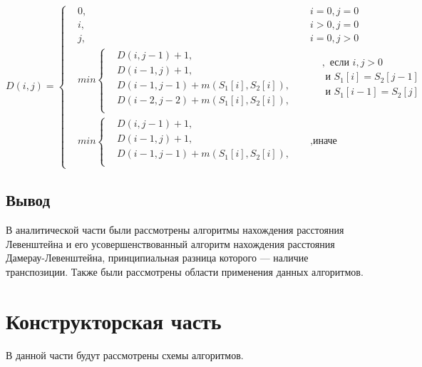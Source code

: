 \documentclass[a4paper, 14pt]{article}
\begin{document}
		     \[ D(i, j) =  \left\{
			\begin{aligned}
				&0, && i = 0, j = 0\\
		    	&i, && i > 0, j = 0\\
		    	&j, && i = 0, j > 0\\		    	
		    	&min \left\{
				\begin{aligned}
					&D(i, j - 1) + 1,\\
		            &D(i - 1, j) + 1,\\
		            &D(i - 1, j - 1) + m(S_{1}[i], S_{2}[i]), \\
		            &D(i - 2, j - 2) + m(S_{1}[i], S_{2}[i]),\\
		        \end{aligned} \right.
		        && 
				\begin{aligned}
					&, \text{ если } i, j > 0 \\
		            & \text{ и } S_{1}[i] = S_{2}[j - 1] \\
		            & \text{ и } S_{1}[i - 1] =  S_{2}[j] \\
		        \end{aligned} \\ 
		        &min \left\{
		        \begin{aligned}
		            &D(i, j - 1) + 1,\\
		            &D(i - 1, j) + 1, \\
		            &D(i - 1, j - 1) + m(S_{1}[i], S_{2}[i]),\\
		        \end{aligned} \right.  &&, \text{иначе}
			\end{aligned} \right.
			\]	

	\subsection{Вывод}
	
	В аналитической части были рассмотрены  алгоритмы нахождения расстояния Левенштейна и его усовершенствованный алгоритм нахождения расстояния Дамерау-Левенштейна, принципиальная разница которого — наличие транспозиции. Также были рассмотрены области применения данных алгоритмов.
	
	\newpage
	\section{Конструкторская часть}
	
	В данной части будут рассмотрены схемы алгоритмов.
	
\end{document}

